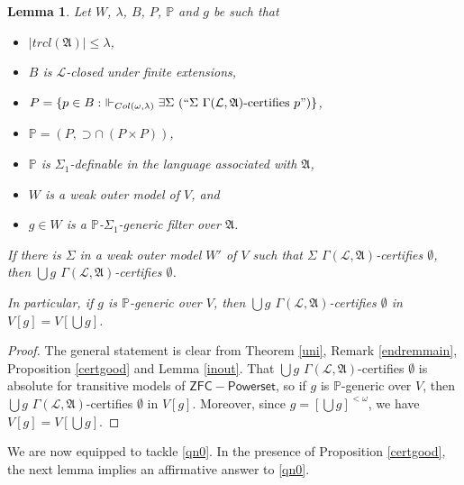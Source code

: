 \documentclass[12pt, twoside]{memoir}
\numberwithin{equation}{section}
\newtheorem{lem}[thm]{Lemma}
\theoremstyle{definition}
\theoremstyle{remark}
\theoremstyle{definition}
\theoremstyle{definition}
\theoremstyle{definition}
\theoremstyle{remark}
\begin{document}
\begin{lem}\label{main2}
Let $W$, $\lambda$, $B$, $P$, $\mathbb{P}$ and $g$ be such that
\begin{itemize}
    \item $|trcl(\mathfrak{A})| \leq \lambda$,
    \item $B$ is $\mathcal{L}$-closed under finite extensions,
    \item $P = \{p \in B : \ \Vdash_{Col(\omega, \lambda)} \exists \Sigma \ (``\Sigma \ \Gamma(\mathcal{L}, \mathfrak{A}) \text{-certifies } p")\}$,
    \item $\mathbb{P} = (P, \supset \cap \ (P \times P))$, 
    \item $\mathbb{P}$ is $\Sigma_1$-definable in the language associated with $\mathfrak{A}$,
    \item $W$ is a weak outer model of $V$, and
    \item $g \in W$ is a $\mathbb{P}$-$\Sigma_1$-generic filter over $\mathfrak{A}$.
\end{itemize}
If there is $\Sigma$ in a weak outer model $W'$ of $V$ such that $\Sigma$ $\Gamma(\mathcal{L}, \mathfrak{A})$-certifies $\emptyset$, then $\bigcup g$ $\Gamma(\mathcal{L}, \mathfrak{A})$-certifies $\emptyset$.

In particular, if $g$ is $\mathbb{P}$-generic over $V$, then $\bigcup g$ $\Gamma(\mathcal{L}, \mathfrak{A})$-certifies $\emptyset$ in $V[g] = V[\bigcup g]$.
\end{lem}

\begin{proof}
The general statement is clear from Theorem \ref{uni}, Remark \ref{endremmain}, Proposition \ref{certgood} and Lemma \ref{inout}. That $\bigcup g$ $\Gamma(\mathcal{L}, \mathfrak{A})$-certifies $\emptyset$ is absolute for transitive models of $\mathsf{ZFC - Powerset}$, so if $g$ is $\mathbb{P}$-generic over $V$, then  $\bigcup g$ $\Gamma(\mathcal{L}, \mathfrak{A})$-certifies $\emptyset$ in $V[g]$. Moreover, since $g = [\bigcup g]^{< \omega}$, we have $V[g] = V[\bigcup g]$.
\end{proof}

We are now equipped to tackle \ref{qn0}. In the presence of Proposition \ref{certgood}, the next lemma implies an affirmative answer to \ref{qn0}.
\end{document}
